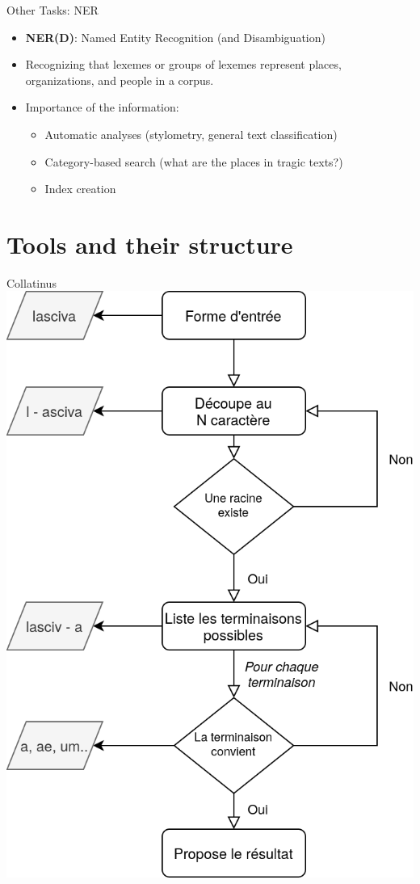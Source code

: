 \documentclass[aspectratio=169]{beamer}
\begin{document}
\begin{frame}{Other Tasks: NER}

\begin{itemize}
    \item \textbf{NER(D)}: Named Entity Recognition (and Disambiguation)
    \item Recognizing that lexemes or groups of lexemes represent places, organizations, and people in a corpus.
    \item Importance of the information: \begin{itemize}
        \item Automatic analyses (stylometry, general text classification)
        \item Category-based search (what are the places in tragic texts?)
        \item Index creation
    \end{itemize}
\end{itemize}
    
\end{frame}

\section{Tools and their structure}

\begin{frame}{Collatinus}
    \centering
    \includegraphics[height=\textheight]{nlp-for-ch/images/collatinus.png}
\end{frame}
\end{document}
